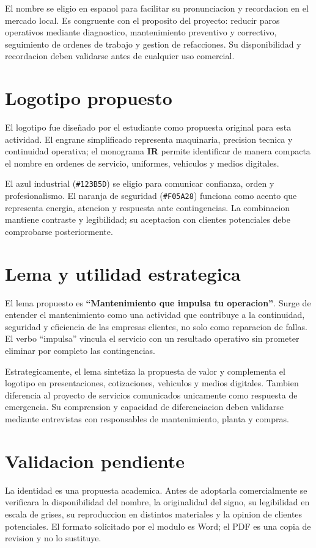 \documentclass[12pt,letterpaper]{article}
\begin{document}
El nombre se eligio en espanol para facilitar su pronunciacion y recordacion en el mercado local. Es congruente con el proposito del proyecto: reducir paros operativos mediante diagnostico, mantenimiento preventivo y correctivo, seguimiento de ordenes de trabajo y gestion de refacciones. Su disponibilidad y recordacion deben validarse antes de cualquier uso comercial.

\section*{Logotipo propuesto}
El logotipo fue diseñado por el estudiante como propuesta original para esta actividad. El engrane simplificado representa maquinaria, precision tecnica y continuidad operativa; el monograma \textbf{IR} permite identificar de manera compacta el nombre en ordenes de servicio, uniformes, vehiculos y medios digitales.

El azul industrial (\texttt{\#123B5D}) se eligio para comunicar confianza, orden y profesionalismo. El naranja de seguridad (\texttt{\#F05A28}) funciona como acento que representa energia, atencion y respuesta ante contingencias. La combinacion mantiene contraste y legibilidad; su aceptacion con clientes potenciales debe comprobarse posteriormente.

\section*{Lema y utilidad estrategica}
El lema propuesto es \textbf{``Mantenimiento que impulsa tu operacion''}. Surge de entender el mantenimiento como una actividad que contribuye a la continuidad, seguridad y eficiencia de las empresas clientes, no solo como reparacion de fallas. El verbo ``impulsa'' vincula el servicio con un resultado operativo sin prometer eliminar por completo las contingencias.

Estrategicamente, el lema sintetiza la propuesta de valor y complementa el logotipo en presentaciones, cotizaciones, vehiculos y medios digitales. Tambien diferencia al proyecto de servicios comunicados unicamente como respuesta de emergencia. Su comprension y capacidad de diferenciacion deben validarse mediante entrevistas con responsables de mantenimiento, planta y compras.

\section*{Validacion pendiente}
La identidad es una propuesta academica. Antes de adoptarla comercialmente se verificara la disponibilidad del nombre, la originalidad del signo, su legibilidad en escala de grises, su reproduccion en distintos materiales y la opinion de clientes potenciales. El formato solicitado por el modulo es Word; el PDF es una copia de revision y no lo sustituye.
\end{document}
